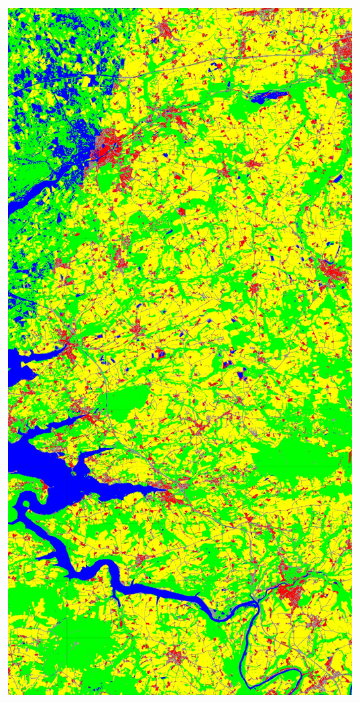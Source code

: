 \documentclass[10pt]{article}
\begin{document}
\label{app:subsec:entire_area}

\begin{figure}[H]
    \centering 
    \begin{subfigure}{0.49\textwidth}
        \centering
        \includegraphics[width=\textwidth]{all_classif_S2}

\end{subfigure}
\end{figure}
\end{document}

